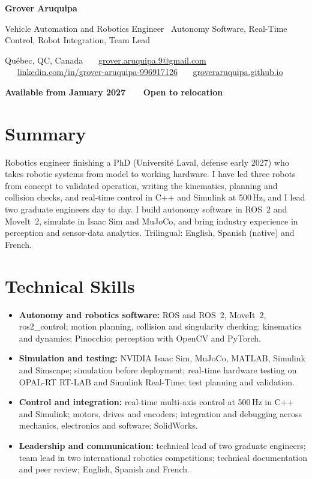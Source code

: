 \documentclass[10pt,letterpaper]{article}
\begin{document}
{\LARGE\bfseries Grover Aruquipa}\par\vspace{2pt}
{\large Vehicle Automation and Robotics Engineer \textbar\ Autonomy Software, Real-Time Control, Robot Integration, Team Lead}\par\vspace{3pt}
{\small Qu\'ebec, QC, Canada \ \textbullet\ \
\href{mailto:grover.aruquipa.9@gmail.com}{grover.aruquipa.9@gmail.com} \ \textbullet\ \
\href{https://www.linkedin.com/in/grover-aruquipa-996917126}{linkedin.com/in/grover-aruquipa-996917126} \ \textbullet\ \
\href{https://groveraruquipa.github.io}{groveraruquipa.github.io}}\par\vspace{1pt}
{\small\bfseries Available from January 2027 \ \textbullet\ \ Open to relocation}\par


\section{Summary}
Robotics engineer finishing a PhD (Universit\'e Laval, defense early 2027) who takes robotic systems from model to
working hardware. I have led three robots from concept to validated operation, writing the kinematics, planning and
collision checks, and real-time control in C++ and Simulink at 500\,Hz, and I lead two graduate engineers day to day.
I build autonomy software in ROS~2 and MoveIt~2, simulate in Isaac Sim and MuJoCo, and bring industry experience in
perception and sensor-data analytics. Trilingual: English, Spanish (native) and French.

\section{Technical Skills}
\begin{itemize}
\item \textbf{Autonomy and robotics software:} ROS and ROS~2, MoveIt~2, ros2\_control; motion planning, collision and
singularity checking; kinematics and dynamics; Pinocchio; perception with OpenCV and PyTorch.
\item \textbf{Simulation and testing:} NVIDIA Isaac Sim, MuJoCo, MATLAB, Simulink and Simscape; simulation before
deployment; real-time hardware testing on OPAL-RT RT-LAB and Simulink Real-Time; test planning and validation.
\item \textbf{Control and integration:} real-time multi-axis control at 500\,Hz in C++ and Simulink; motors, drives and
encoders; integration and debugging across mechanics, electronics and software; SolidWorks.
\item \textbf{Leadership and communication:} technical lead of two graduate engineers; team lead in two international
robotics competitions; technical documentation and peer review; English, Spanish and French.
\end{itemize}
\end{document}
